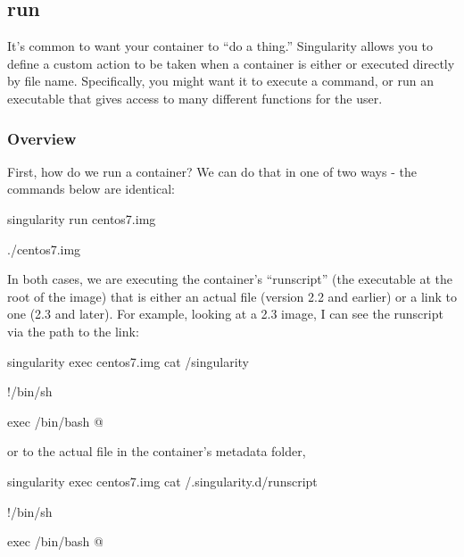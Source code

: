 \documentclass[letterpaper,10pt,english]{sphinxmanual}
\begin{document}
\subsection{run}
\label{\detokenize{appendix:run}}\label{\detokenize{appendix:run-command}}
It’s common to want your container to “do a thing.” Singularity  allows
you to define a custom action to be taken when a container is either  or
executed directly by file name. Specifically, you might want it to
execute a command, or run an executable that gives access to many
different functions for the user.


\subsubsection{Overview}
\label{\detokenize{appendix:id35}}
First, how do we run a container? We can do that in one of two ways -
the commands below are identical:

%
\begin{sphinxVerbatim}[commandchars=\\\{\}]
\PYGZdl{} singularity run centos7.img

\PYGZdl{} ./centos7.img
\end{sphinxVerbatim}

In both cases, we are executing the container’s “runscript” (the
executable  at the root of the image) that is either an actual file
(version 2.2 and earlier) or a link to one (2.3 and later). For example,
looking at a 2.3 image, I can see the runscript via the path to the
link:

%
\begin{sphinxVerbatim}[commandchars=\\\{\}]
\PYGZdl{} singularity exec centos7.img cat /singularity

\PYGZsh{}!/bin/sh


exec /bin/bash \PYGZdq{}\PYGZdl{}@\PYGZdq{}
\end{sphinxVerbatim}

or to the actual file in the container’s metadata folder, 

%
\begin{sphinxVerbatim}[commandchars=\\\{\}]
\PYGZdl{} singularity exec centos7.img cat /.singularity.d/runscript

\PYGZsh{}!/bin/sh


exec /bin/bash \PYGZdq{}\PYGZdl{}@\PYGZdq{}
\end{sphinxVerbatim}
\end{document}
